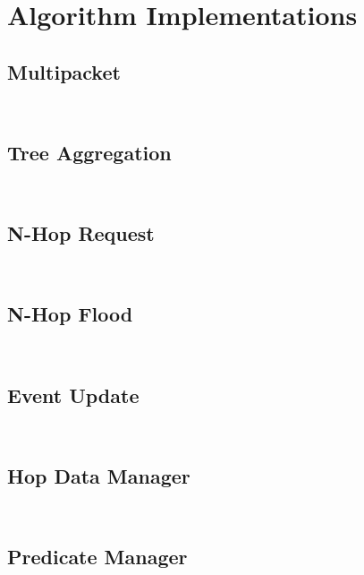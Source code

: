 \documentclass[a4paper,notitlepage]{article}
\newcommand{\sourcecode}[3]{%
\inputminted[linenos=true,tabsize=4,fontsize=\small,frame=lines,framesep=2mm]{c}{#1/#2}
\inputminted[linenos=true,tabsize=4,fontsize=\small,frame=lines,framesep=2mm]{c}{#1/#3}
}
\begin{document}

\clearpage


\appendixpage
\addappheadtotoc
\appendix



\newpage

\section{Algorithm Implementations}

\subsection{Multipacket}
\sourcecode{../Algorithms/Common/net}{multipacket.h}{multipacket.c}

\subsection{Tree Aggregation}
\sourcecode{../Algorithms/Common/net}{tree-aggregator.h}{tree-aggregator.c}

\subsection{N-Hop Request}
\sourcecode{../Algorithms/Common/net}{nhopreq.h}{nhopreq.c}

\subsection{N-Hop Flood}
\sourcecode{../Algorithms/Common/net}{nhopflood.h}{nhopflood.c}

\subsection{Event Update}
\sourcecode{../Algorithms/Common/net}{eventupdate.h}{eventupdate.c}

\subsection{Hop Data Manager}
\sourcecode{../Algorithms/PredEval}{hop-data-manager.h}{hop-data-manager.c}

\subsection{Predicate Manager}
\sourcecode{../Algorithms/PredEval}{predicate-manager.h}{predicate-manager.c}
\end{document}
